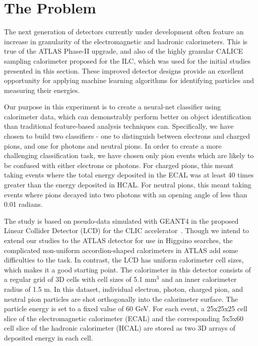 \chapter{The Problem}

The next generation of detectors currently under development often feature an increase in granularity of the electromagnetic and hadronic calorimeters. This is true of the ATLAS Phase-II upgrade, and also of the highly granular CALICE sampling calorimeter proposed for the ILC, which was used for the initial studies presented in this section. These improved detector designs provide an excellent opportunity for applying machine learning algorithms for identifying particles and measuring their energies.

Our purpose in this experiment is to create a neural-net classifier using calorimeter data, which can demonstrably perform better on object identification than traditional feature-based analysis techniques can. Specifically, we have chosen to build two classifiers - one to distinguish between electrons and charged pions, and one for photons and neutral pions. In order to create a more challenging classification task, we have chosen only pion events which are likely to be confused with either electrons or photons. For charged pions, this meant taking events where the total energy deposited in the ECAL was at least 40 times greater than the energy deposited in HCAL. For neutral pions, this meant taking events where pions decayed into two photons with an opening angle of less than 0.01 radians.

The study is based on pseudo-data simulated with GEANT4 in the proposed Linear Collider Detector (LCD) for the CLIC accelerator~\cite{Lebrun}. Though we intend to extend our studies to the ATLAS detector for use in Higgsino searches, the complicated non-uniform accordion-shaped calorimeters in ATLAS add some difficulties to the task. In contrast, the LCD has uniform calorimeter cell sizes, which makes it a good starting point. The calorimeter in this detector consists of a regular grid of 3D cells with cell sizes of 5.1 mm$^3$ and an inner calorimeter radius of 1.5 m. In this dataset, individual electron, photon, charged pion, and neutral pion particles are shot orthogonally into the calorimeter surface. The particle energy is set to a fixed value of 60 GeV. For each event, a 25x25x25 cell slice of the electromagnetic calorimeter (ECAL) and the corresponding 5x5x60 cell slice of the hadronic calorimeter (HCAL) are stored as two 3D arrays of deposited energy in each cell.

